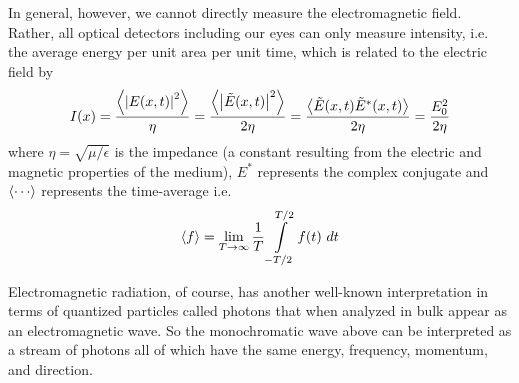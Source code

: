 In general, however, we cannot directly measure the electromagnetic field. Rather, all optical detectors including our eyes can only measure intensity, i.e. the average energy per unit area per unit time, which is related to the electric field by
\begin{equation} \label{eq:field_intensity}
I(x) = \frac{\expval{\abs{E(x,t)}^2}}{\eta} 
= \frac{\expval{\abs{\tilde{E}(x,t)}^2}}{2\eta} 
= \frac{\expval{\tilde{E}(x,t)\tilde{E}^*(x,t)}}{2\eta} 
= \frac{E_0^2}{2\eta}
\end{equation}
where $\eta = \sqrt{\mu/\epsilon}$ is the impedance (a constant resulting from the electric and magnetic properties of the medium), $E^*$ represents the complex conjugate and $\expval{\cdots}$ represents the time-average i.e.
\begin{equation}
\expval{f} = \lim\limits_{T\rightarrow\infty} \frac{1}{T} \int\limits_{-T/2}^{T/2} f(t)~dt
\end{equation}


Electromagnetic radiation, of course, has another well-known interpretation in terms of quantized particles called photons that when analyzed in bulk appear as an electromagnetic wave. So the monochromatic wave above can be interpreted as a stream of photons all of which have the same energy, frequency, momentum, and direction.

